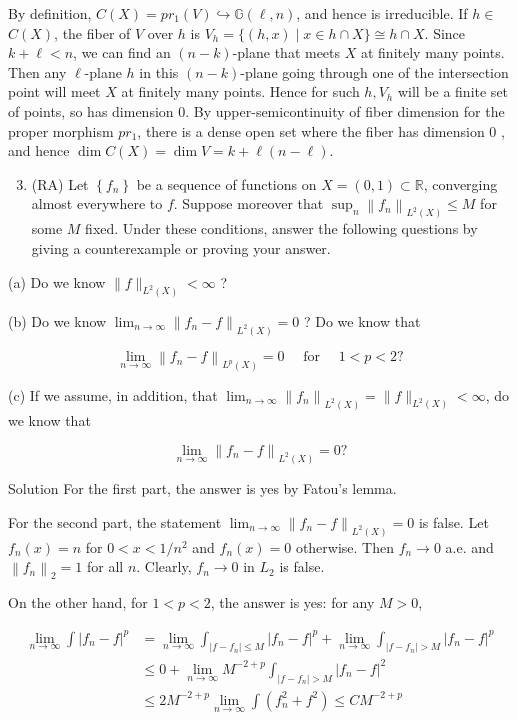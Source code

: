 \documentclass[10pt]{article}
\begin{document}
By definition, $C(X)=p r_{1}(V) \hookrightarrow \mathbb{G}(\ell, n)$, and hence is irreducible. If $h \in$ $C(X)$, the fiber of $V$ over $h$ is $V_{h}=\{(h, x) \mid x \in h \cap X\} \cong h \cap X$. Since $k+\ell<n$, we can find an $(n-k)$-plane that meets $X$ at finitely many points. Then any $\ell$-plane $h$ in this $(n-k)$-plane going through one of the intersection point will meet $X$ at finitely many points. Hence for such $h, V_{h}$ will be a finite set of points, so has dimension 0. By upper-semicontinuity of fiber dimension for the proper morphism $p r_{1}$, there is a dense open set where the fiber has dimension 0 , and hence $\operatorname{dim} C(X)=\operatorname{dim} V=k+\ell(n-\ell)$.

\begin{enumerate}
  \setcounter{enumi}{2}
  \item (RA) Let $\left\{f_{n}\right\}$ be a sequence of functions on $X=(0,1) \subset \mathbb{R}$, converging almost everywhere to $f$. Suppose moreover that $\sup _{n}\left\|f_{n}\right\|_{L^{2}(X)} \leq M$ for some $M$ fixed. Under these conditions, answer the following questions by giving a counterexample or proving your answer.
\end{enumerate}

(a) Do we know $\|f\|_{L^{2}(X)}<\infty$ ?

(b) Do we know $\lim _{n \rightarrow \infty}\left\|f_{n}-f\right\|_{L^{2}(X)}=0$ ? Do we know that

$$
\lim _{n \rightarrow \infty}\left\|f_{n}-f\right\|_{L^{p}(X)}=0 \quad \text { for } \quad 1<p<2 ?
$$

(c) If we assume, in addition, that $\lim _{n \rightarrow \infty}\left\|f_{n}\right\|_{L^{2}(X)}=\|f\|_{L^{2}(X)}<\infty$, do we know that

$$
\lim _{n \rightarrow \infty}\left\|f_{n}-f\right\|_{L^{2}(X)}=0 ?
$$

Solution For the first part, the answer is yes by Fatou's lemma.

For the second part, the statement $\lim _{n \rightarrow \infty}\left\|f_{n}-f\right\|_{L^{2}(X)}=0$ is false. Let $f_{n}(x)=n$ for $0<x<1 / n^{2}$ and $f_{n}(x)=0$ otherwise. Then $f_{n} \rightarrow 0$ a.e. and $\left\|f_{n}\right\|_{2}=1$ for all $n$. Clearly, $f_{n} \rightarrow 0$ in $L_{2}$ is false.

On the other hand, for $1<p<2$, the answer is yes: for any $M>0$,

$$
\begin{aligned}
\lim _{n \rightarrow \infty} \int\left|f_{n}-f\right|^{p} & =\lim _{n \rightarrow \infty} \int_{\left|f-f_{n}\right| \leq M}\left|f_{n}-f\right|^{p}+\lim _{n \rightarrow \infty} \int_{\left|f-f_{n}\right|>M}\left|f_{n}-f\right|^{p} \\
& \leq 0+\lim _{n \rightarrow \infty} M^{-2+p} \int_{\left|f-f_{n}\right|>M}\left|f_{n}-f\right|^{2} \\
& \leq 2 M^{-2+p} \lim _{n \rightarrow \infty} \int\left(f_{n}^{2}+f^{2}\right) \leq C M^{-2+p}
\end{aligned}
$$
\end{document}
